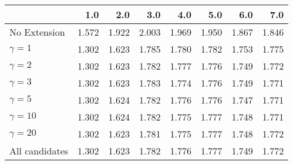 \begin{tabular}{lrrrrrrr}
\toprule
{} &   1.0 &   2.0 &   3.0 &   4.0 &   5.0 &   6.0 &   7.0 \\
\midrule
No Extension   & 1.572 & 1.922 & 2.003 & 1.969 & 1.950 & 1.867 & 1.846 \\
$\gamma = 1$   & 1.302 & 1.623 & 1.785 & 1.780 & 1.782 & 1.753 & 1.775 \\
$\gamma = 2$   & 1.302 & 1.623 & 1.782 & 1.777 & 1.776 & 1.749 & 1.772 \\
$\gamma = 3$   & 1.302 & 1.623 & 1.783 & 1.774 & 1.776 & 1.749 & 1.771 \\
$\gamma = 5$   & 1.302 & 1.624 & 1.782 & 1.776 & 1.776 & 1.747 & 1.771 \\
$\gamma = 10$  & 1.302 & 1.624 & 1.782 & 1.775 & 1.777 & 1.748 & 1.771 \\
$\gamma = 20$  & 1.302 & 1.623 & 1.781 & 1.775 & 1.777 & 1.748 & 1.772 \\
All candidates & 1.302 & 1.623 & 1.782 & 1.776 & 1.777 & 1.749 & 1.772 \\
\bottomrule
\end{tabular}
